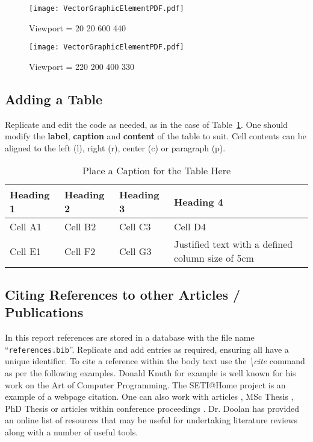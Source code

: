 \begin{figure}[H]
\begin{minipage}[t]{7.4cm}
\begin{center}
\texttt{[image: VectorGraphicElementPDF.pdf]}
\caption{Viewport = 20 20 600 440}
\label{fig:Example1}
\end{center}
\end{minipage}
\hfill
\begin{minipage}[t]{7.4cm}
\begin{center}
\texttt{[image: VectorGraphicElementPDF.pdf]}
\caption{Viewport = 220 200 400 330}
\label{fig:Example2}
\end{center}
\end{minipage}
\end{figure}


\subsection{Adding a Table}
Replicate and edit the code as needed, as in the case of  Table~\ref{tab:TableExample}. One should modify the \textbf{label}, \textbf{caption} and \textbf{content} of the table to suit. Cell contents can be aligned to the left (l), right (r), center (c) or paragraph (p). 
\begin{table}[H]
\caption{Place a Caption for the Table Here}\label{tab:TableExample}
\centering
\small
\begin{tabular}{lllp{5cm}}
\toprule \textbf{Heading 1}& \textbf{Heading 2}&\textbf{Heading 3}&\textbf{Heading 4}\\
\midrule
Cell A1 & Cell B2 & Cell C3 & Cell D4\\
Cell E1 & Cell F2 & Cell G3 & Justified text with a defined column size of 5cm\\
\bottomrule
\end{tabular}
\end{table}

\subsection{Citing References to other Articles / Publications}
In this report references are stored in a database with the file name ``{\tt references.bib}''. Replicate and add entries as required, ensuring all have a unique identifier. To cite a reference within the  body text use the \emph{\textbackslash cite} command as per the following examples. Donald Knuth \cite{book:knuth_1973} for example is well known for his work on the Art of Computer Programming. The SETI@Home project \cite{online:berkeleyBOINC} is an example of a webpage citation. One can also work with articles \cite{art:Russell:1978:Cray1}, MSc Thesis \cite{msc:Shannon:1940}, PhD Thesis \cite{phd:Sutherland:1963} or articles within conference proceedings \cite{proc:Ewald:1978:HPG}. Dr. Doolan \cite{online:Doolan:2016:AcademicResources} has provided an online list of resources that may be useful for undertaking literature reviews along with a number of useful \latex tools. 

